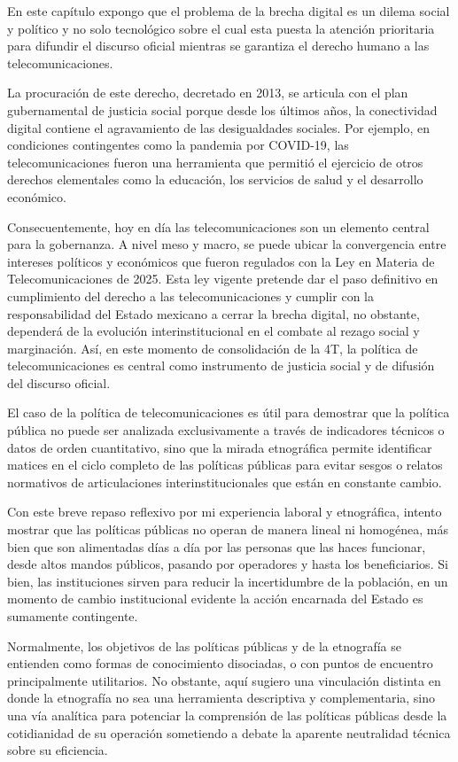 \documentclass[
  spanish,
  11pt,
  a4paper,
]{scrbook}
\begin{document}
En este capítulo expongo que el problema de la brecha digital es un
dilema social y político y no solo tecnológico sobre el cual esta puesta
la atención prioritaria para difundir el discurso oficial mientras se
garantiza el derecho humano a las telecomunicaciones.

La procuración de este derecho, decretado en 2013, se articula con el
plan gubernamental de justicia social porque desde los últimos años, la
conectividad digital contiene el agravamiento de las desigualdades
sociales. Por ejemplo, en condiciones contingentes como la pandemia por
COVID-19, las telecomunicaciones fueron una herramienta que permitió el
ejercicio de otros derechos elementales como la educación, los servicios
de salud y el desarrollo económico.

Consecuentemente, hoy en día las telecomunicaciones son un elemento
central para la gobernanza. A nivel meso y macro, se puede ubicar la
convergencia entre intereses políticos y económicos que fueron regulados
con la Ley en Materia de Telecomunicaciones de 2025. Esta ley vigente
pretende dar el paso definitivo en cumplimiento del derecho a las
telecomunicaciones y cumplir con la responsabilidad del Estado mexicano
a cerrar la brecha digital, no obstante, dependerá de la evolución
interinstitucional en el combate al rezago social y marginación. Así, en
este momento de consolidación de la 4T, la política de
telecomunicaciones es central como instrumento de justicia social y de
difusión del discurso oficial.

El caso de la política de telecomunicaciones es útil para demostrar que
la política pública no puede ser analizada exclusivamente a través de
indicadores técnicos o datos de orden cuantitativo, sino que la mirada
etnográfica permite identificar matices en el ciclo completo de las
políticas públicas para evitar sesgos o relatos normativos de
articulaciones interinstitucionales que están en constante cambio.

Con este breve repaso reflexivo por mi experiencia laboral y
etnográfica, intento mostrar que las políticas públicas no operan de
manera lineal ni homogénea, más bien que son alimentadas días a día por
las personas que las haces funcionar, desde altos mandos públicos,
pasando por operadores y hasta los beneficiarios. Si bien, las
instituciones sirven para reducir la incertidumbre de la población, en
un momento de cambio institucional evidente la acción encarnada del
Estado es sumamente contingente.

Normalmente, los objetivos de las políticas públicas y de la etnografía
se entienden como formas de conocimiento disociadas, o con puntos de
encuentro principalmente utilitarios. No obstante, aquí sugiero una
vinculación distinta en donde la etnografía no sea una herramienta
descriptiva y complementaria, sino una vía analítica para potenciar la
comprensión de las políticas públicas desde la cotidianidad de su
operación sometiendo a debate la aparente neutralidad técnica sobre su
eficiencia.
\end{document}
